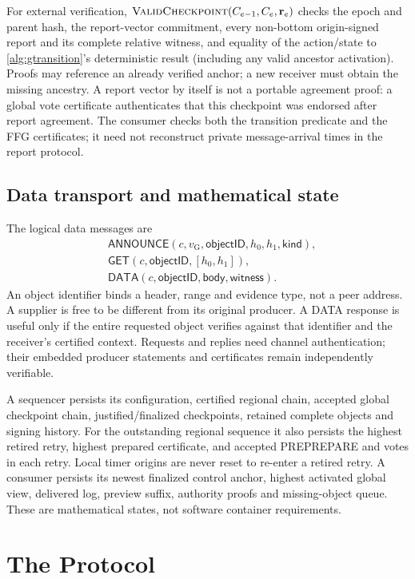 \documentclass[11pt,a4paper,onecolumn]{article}
\newcommand{\gv}{v_{\mathrm G}}
\newcommand{\Tag}[1]{\mathsf{#1}}
\newcommand{\Proc}[1]{\textnormal{\textsc{#1}}}
\theoremstyle{remark}\newtheorem{example}[definition]{Example}
\newcounter{protocol}
\begin{document}
For external verification, $\Proc{ValidCheckpoint}(C_{e-1},C_e,\mathbf r_e)$
checks the epoch and parent hash, the report-vector commitment, every non-bottom
origin-signed report and its complete relative witness, and equality of the
action/state to \cref{alg:gtransition}'s deterministic result (including any
valid ancestor activation). Proofs may reference an already verified anchor;
a new receiver must obtain the missing ancestry. A report vector by itself is
not a portable agreement proof: a global vote certificate authenticates that
this checkpoint was endorsed after report agreement. The consumer checks both
the transition predicate and the FFG certificates; it need not reconstruct
private message-arrival times in the report protocol.

\subsection{Data transport and mathematical state}\label{sec:transport}
The logical data messages are
\begin{align*}
 &\Tag{ANNOUNCE}(c,\gv,\mathsf{objectID},h_0,h_1,\mathsf{kind}),\\
 &\Tag{GET}(c,\mathsf{objectID},[h_0,h_1]),\\
 &\Tag{DATA}(c,\mathsf{objectID},\mathsf{body},\mathsf{witness}).
\end{align*}
An object identifier binds a header, range and evidence type, not a peer address.
A supplier is free to be different from its original producer. A DATA response
is useful only if the entire requested object verifies against that identifier
and the receiver's certified context. Requests and replies need channel
authentication; their embedded producer statements and certificates remain
independently verifiable.


A sequencer persists its configuration, certified regional chain, accepted
global checkpoint chain, justified/finalized checkpoints, retained complete
objects and signing history. For the outstanding regional sequence it also
persists the highest retired retry, highest prepared certificate, and accepted
PREPREPARE and votes in each retry. Local timer origins are never reset to
re-enter a retired retry. A consumer persists its newest finalized control
anchor, highest activated global view, delivered log, preview suffix, authority
proofs and missing-object queue. These are mathematical states, not software
container requirements.

\section{The Protocol}\label{sec:protocol}
\end{document}
